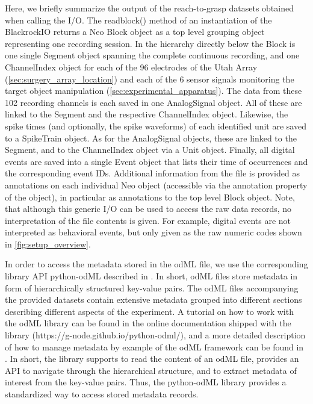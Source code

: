 {Here, we briefly summarize the output of the reach-to-grasp datasets obtained when calling the I/O. The readblock() method of an instantiation of the BlackrockIO returns a Neo Block object as a top level grouping object representing one recording session. In the hierarchy directly below the Block is one single Segment object spanning the complete continuous recording, and one ChannelIndex object for each of the 96 electrodes of the Utah Array (\ref{sec:surgery_array_location}) and each of the 6 sensor signals monitoring the target object manipulation (\cref{sec:experimental_apparatus}). The data from these 102 recording channels is each saved in one AnalogSignal object. All of these are linked to the Segment and the respective ChannelIndex object. Likewise, the spike times (and optionally, the spike waveforms) of each identified unit are saved to a SpikeTrain object. As for the AnalogSignal objects, these are linked to the Segment, and to the ChannelIndex object via a Unit object. Finally, all digital events are saved into a single Event object that lists their time of occurrences and the corresponding event IDs. Additional information from the file is provided as annotations on each individual Neo object (accessible via the annotation property of the object), in particular as annotations to the top level Block object. Note, that although this generic I/O can be used to access the raw data records, no interpretation of the file contents is given. For example, digital events are not interpreted as behavioral events, but only given as the raw numeric codes shown in \cref{fig:setup_overview}. 

In order to access the metadata stored in the odML file, we use the corresponding library API python-odML described in \cite{Grewe_2011}. In short, odML files store metadata in form of hierarchically structured key-value pairs. The odML files accompanying the provided datasets contain extensive metadata grouped into different sections describing different aspects of the experiment. A tutorial on how to work with the odML library can be found in the online documentation shipped with the library (https://g-node.github.io/python-odml/), and a more detailed description of how to manage metadata by example of the odML framework can be found in \cite{Zehl_2016}. In short, the library supports to read the content of an odML file, provides an API to navigate through the hierarchical structure, and to extract metadata of interest from the key-value pairs. Thus, the python-odML library provides a standardized way to access stored metadata records. 

}
